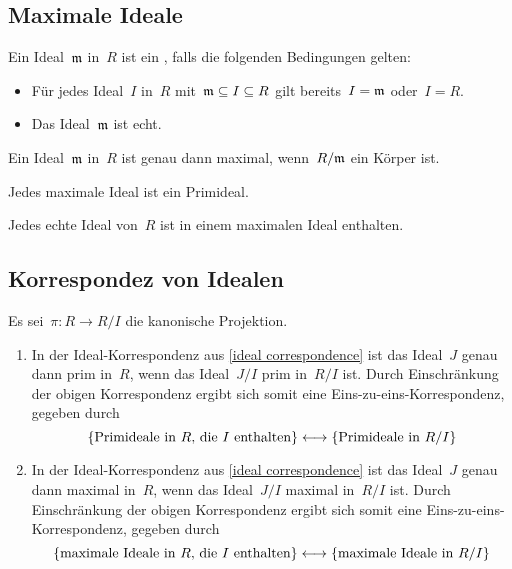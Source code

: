 \subsection{Maximale Ideale}

\begin{definition}
  Ein Ideal~$\mathfrak{m}$ in~$R$ ist ein , falls die folgenden Bedingungen gelten:
  \begin{itemize}
    \item
     Für jedes Ideal~$I$ in~$R$ mit~$\mathfrak{m} \subseteq I \subseteq R$ gilt bereits~$I = \mathfrak{m}$ oder~$I = R$.
    \item
      Das Ideal~$\mathfrak{m}$ ist echt.
  \end{itemize}
\end{definition}

\begin{proposition}
  Ein Ideal~$\mathfrak{m}$ in~$R$ ist genau dann maximal, wenn~$R/\mathfrak{m}$ ein Körper ist.
\end{proposition}

\begin{corollary}
  Jedes maximale Ideal ist ein Primideal.
\end{corollary}

\begin{proposition}
  Jedes echte Ideal von~$R$ ist in einem maximalen Ideal enthalten.
\end{proposition}



\subsection{Korrespondez von Idealen}

\begin{theorem}
  Es sei~$\pi \colon R \to R/I$ die kanonische Projektion.
  \begin{enumerate}
    \item
      In der Ideal-Korrespondenz aus \cref{ideal correspondence} ist das Ideal~$J$ genau dann prim in~$R$, wenn das Ideal~$J/I$ prim in~$R/I$ ist.
      Durch Einschränkung der obigen Korrespondenz ergibt sich somit eine Eins-zu-eins-Korrespondenz, gegeben durch
      \[
        \{
          \text{Primideale in~$R$, die~$I$ enthalten}
        \}
        \onetoone
        \{ \text{Primideale in~$R/I$} \}
      \]
    \item
      In der Ideal-Korrespondenz aus \cref{ideal correspondence} ist das Ideal~$J$ genau dann maximal in~$R$, wenn das Ideal~$J/I$ maximal in~$R/I$ ist.
      Durch Einschränkung der obigen Korrespondenz ergibt sich somit eine Eins-zu-eins-Korrespondenz, gegeben durch
      \[
        \{
          \text{maximale Ideale in~$R$, die~$I$ enthalten}
        \}
        \onetoone
        \{ \text{maximale Ideale in~$R/I$} \}
      \]
  \end{enumerate}
\end{theorem}





